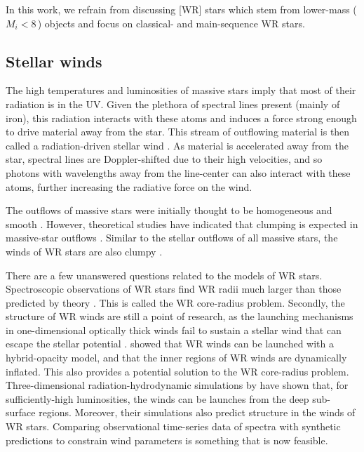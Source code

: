 In this work, we refrain from discussing [WR] stars which stem from lower-mass ($M_i < 8\,$\Msun{}) objects and focus on classical- and main-sequence WR stars.

\subsection{Stellar winds}

The high temperatures and luminosities of massive stars imply that most of their radiation is in the UV. Given the plethora of spectral lines present (mainly of iron), this radiation interacts with these atoms and induces a force strong enough to drive material away from the star. This stream of outflowing material is then called a radiation-driven stellar wind \citep{1970LucySolomon,1975castor}. As material is accelerated away from the star, spectral lines are Doppler-shifted due to their high velocities, and so photons with wavelengths away from the line-center can also interact with these atoms, further increasing the radiative force on the wind. 

The outflows of massive stars were initially thought to be homogeneous and smooth \citep{1988deJager,1990Nieuwenhuijzen}. However, theoretical studies have indicated that clumping is expected in massive-star outflows \citep{1988Owocki,2005DessartOwocki,2013SundqvistOwocki,2018Sundqvist,2019A&A...631A.172D}. Similar to the stellar outflows of all massive stars, the winds of WR stars are also clumpy \citep{1991Hillier_clumping_escattering,1998Hamann_clumping,puls_bright_2006,fullerton_discordance_2006}. 

There are a few unanswered questions related to the models of WR stars. Spectroscopic observations of WR stars find WR radii much larger than those predicted by theory \citep{2007Crowther,hamann_galactic_2019,sander_galactic_2019}. This is called the WR core-radius problem. Secondly, the structure of WR winds are still a point of research, as the launching mechanisms in one-dimensional optically thick winds fail to sustain a stellar wind that can escape the stellar potential \citep[e.g.][]{2016Ro_WR_winds,2017Sander_WR_winds}. \citet{2021Poniatowski} showed that WR winds can be launched with a hybrid-opacity model, and that the inner regions of WR winds are dynamically inflated. This also provides a potential solution to the WR core-radius problem. Three-dimensional radiation-hydrodynamic simulations by \citet{2022Moens} have shown that, for sufficiently-high luminosities, the winds can be launches from the deep sub-surface regions. Moreover, their simulations also predict structure in the winds of WR stars. Comparing observational time-series data of spectra \citep[e.g.][]{lepine_wind_2000} with synthetic predictions to constrain wind parameters is something that is now feasible.

